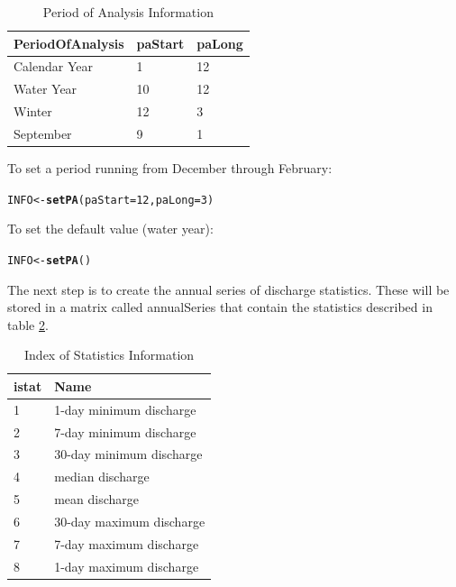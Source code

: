 \documentclass[a4paper,11pt]{article}\usepackage{graphicx, color}
\makeatletter
\newcommand{\hlfunctioncall}[1]{\textcolor[rgb]{0.501960784313725,0,0.329411764705882}{\textbf{#1}}}%
\newenvironment{kframe}{%
 \def\at@end@of@kframe{}%
 \ifinner\ifhmode%
  \def\at@end@of@kframe{\end{minipage}}%
  \begin{minipage}{\columnwidth}%
 \fi\fi%
 \def\FrameCommand##1{\hskip\@totalleftmargin \hskip-\fboxsep
 \colorbox{shadecolor}{##1}\hskip-\fboxsep
     \hskip-\linewidth \hskip-\@totalleftmargin \hskip\columnwidth}%
 \MakeFramed {\advance\hsize-\width
   \@totalleftmargin\z@ \linewidth\hsize
   \@setminipage}}%
 {\par\unskip\endMakeFramed%
 \at@end@of@kframe}
\newenvironment{knitrout}{}{} %
\makeatother
\begin{document}
\begin{table}[!ht]
\centering
\caption{Period of Analysis Information} 
\label{table:paINFO}
\begin{tabular}{lll}
  \hline
PeriodOfAnalysis & paStart & paLong \\ 
  \hline
Calendar Year & 1 & 12 \\ 
  Water Year & 10 & 12 \\ 
  Winter & 12 & 3 \\ 
  September & 9 & 1 \\ 
   \hline
\end{tabular}
\end{table}

To set a period running from December through February:
\begin{knitrout}
\color{fgcolor}\begin{kframe}
\begin{alltt}
INFO <- \hlfunctioncall{setPA}(paStart=12,paLong=3)
\end{alltt}
\end{kframe}
\end{knitrout}


To set the default value (water year):
\begin{knitrout}
\color{fgcolor}\begin{kframe}
\begin{alltt}
INFO <- \hlfunctioncall{setPA}()
\end{alltt}
\end{kframe}
\end{knitrout}


The next step is to create the annual series of discharge statistics.  These will be stored in a matrix called annualSeries that contain the statistics described in table \ref{table:istat}.

\begin{table}[!ht]
\centering
\caption{Index of Statistics Information} 
\label{table:istat}
\begin{tabular}{ll}
  \hline
istat & Name \\ 
  \hline
1 & 1-day minimum discharge \\ 
  2 & 7-day minimum discharge \\ 
  3 & 30-day minimum discharge \\ 
  4 & median discharge \\ 
  5 & mean discharge \\ 
  6 & 30-day maximum discharge \\ 
  7 & 7-day maximum discharge \\ 
  8 & 1-day maximum discharge \\ 
   \hline
\end{tabular}
\end{table}
\end{document}
